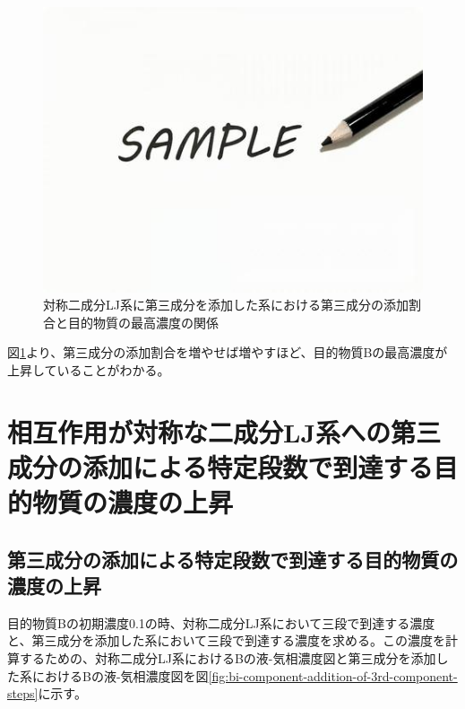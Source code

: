 \documentclass[titlepage]{jsreport}
\begin{document}
\begin{figure}[htbp]
    \begin{center}
        \includegraphics[width=14cm]{fig/sample.jpeg}
    \end{center}
    \caption{対称二成分LJ系に第三成分を添加した系における第三成分の添加割合と目的物質の最高濃度の関係}
    \label{fig:bi-component-addition-of-3rd-component-addition-ratio-highest-purity}
\end{figure}

図\ref{fig:bi-component-addition-of-3rd-component-addition-ratio-highest-purity}より、第三成分の添加割合を増やせば増やすほど、目的物質Bの最高濃度が上昇していることがわかる。


\section{相互作用が対称な二成分LJ系への第三成分の添加による特定段数で到達する目的物質の濃度の上昇} \label{results-sec:bi-component-addition-of-3rd-component-steps}
\subsection{第三成分の添加による特定段数で到達する目的物質の濃度の上昇} \label{results-subsec:bi-component-addition-of-3rd-component-steps}
目的物質Bの初期濃度0.1の時、対称二成分LJ系において三段で到達する濃度と、第三成分を添加した系において三段で到達する濃度を求める。この濃度を計算するための、対称二成分LJ系におけるBの液-気相濃度図と第三成分を添加した系におけるBの液-気相濃度図を図\ref{fig:bi-component-addition-of-3rd-component-steps}に示す。
\end{document}
